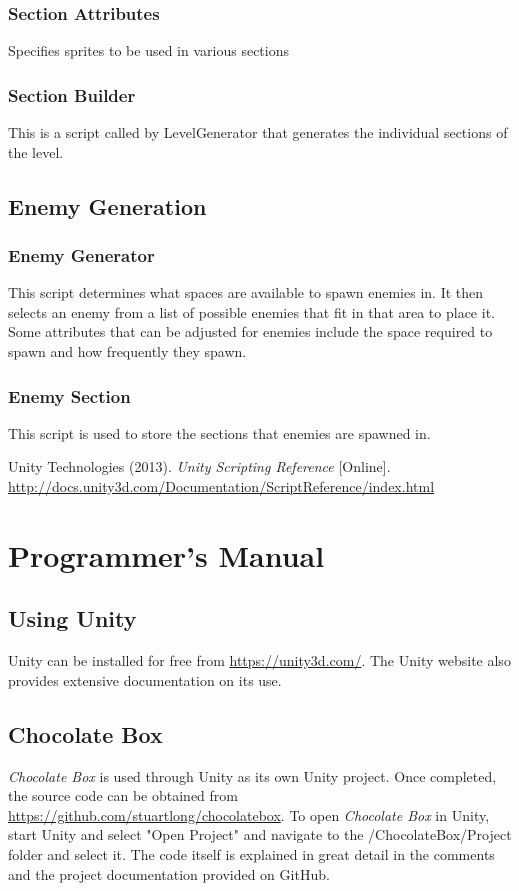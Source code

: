 \documentclass[pdftex,12pt,letter]{article}
\begin{document}
\subsubsection{Section Attributes}
Specifies sprites to be used in various sections
\subsubsection{Section Builder}
This is a script called by LevelGenerator that generates the individual sections of the level.
\subsection{Enemy Generation}
\subsubsection{Enemy Generator}
This script determines what spaces are available to spawn enemies in. It then selects an enemy from a list of possible enemies that fit in that area to place it. Some attributes that can be adjusted for enemies include the space required to spawn and how frequently they spawn.
\subsubsection{Enemy Section}
This script is used to store the sections that enemies are spawned in.

\begin{thebibliography}{3}
Unity Technologies (2013). \textit{Unity Scripting Reference} [Online]. \url{http://docs.unity3d.com/Documentation/ScriptReference/index.html}
\end{thebibliography}

\newpage
\appendix
\section{Programmer's Manual}
\subsection{Using Unity}
Unity can be installed for free from \url{https://unity3d.com/}. The Unity website also provides extensive documentation on its use.
\subsection{Chocolate Box}
\textit{Chocolate Box} is used through Unity as its own Unity project. Once completed, the source code can be obtained from \url{https://github.com/stuartlong/chocolatebox}. To open \textit{Chocolate Box} in Unity, start Unity and select "Open Project" and navigate to the /ChocolateBox/Project folder and select it. The code itself is explained in great detail in the comments and the project documentation provided on GitHub.

\FloatBarrier
\end{document}
